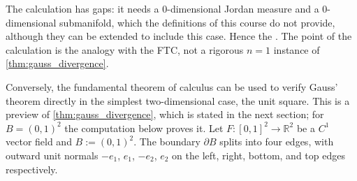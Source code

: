 \begin{ainote}
The calculation has gaps: it needs a $0$-dimensional Jordan measure and a $0$-dimensional
submanifold, which the definitions of this course do not provide, although they can be extended
to include this case. Hence the . The point of the calculation is the analogy with the
FTC, not a rigorous $n=1$ instance of \cref{thm:gauss_divergence}.
\end{ainote}

\begin{example}
\label{ex:gauss_unit_square_by_hand}
Conversely, the fundamental theorem of calculus can be used to verify Gauss' theorem directly in
the simplest two-dimensional case, the unit square. This is a preview of
\cref{thm:gauss_divergence}, which is stated in the next section; for $B = (0,1)^2$ the
computation below proves it. Let $F : [0,1]^2 \to \mathbb{R}^2$ be a $C^1$ vector
field and $B := (0,1)^2$. The boundary $\partial B$ splits into four edges, with outward unit
normals $-e_1$, $e_1$, $-e_2$, $e_2$ on the left, right, bottom, and top edges respectively.

\begin{center}
\end{center}


\end{example}
